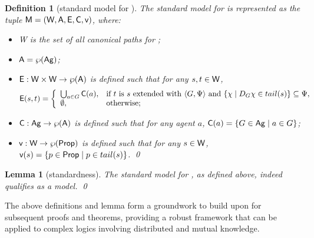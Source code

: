 \documentclass{article}
\newtheorem{definition}[theorem]{Definition}%
\newtheorem{lemma}[theorem]{Lemma}%
\newcommand{\ag}{\text{\normalfont\textsf{Ag}}\xspace}
\newcommand{\CA}{\textnormal{\sf A}\xspace}
\newcommand{\CC}{\textnormal{\sf C}\xspace}
\newcommand{\CE}{\textnormal{\sf E}\xspace}
\newcommand{\CM}{\textnormal{\sf M}\xspace}
\newcommand{\CV}{\textnormal{\sf v}\xspace}
\newcommand{\CW}{\textnormal{\sf W}\xspace}
\newcommand{\prop}{\text{\normalfont\textsf{Prop}}\xspace}
\newcommand{\ld}{\text{\normalfont ELD}\xspace}
\begin{document}
\begin{definition}[standard model for \ld]
The standard model for \ld is represented as the tuple $\CM = (\CW, \CA, \CE, \CC, \CV)$, where:
\begin{itemize}
\item \CW is the set of all canonical paths for \ld;
\item $\CA = \wp(\ag)$;
\item $\CE : \CW \times \CW \to \wp(\CA)$ is defined such that for any $s, t \in \CW$, 
$$\CE(s,t)  = \left\{\begin{array}{ll}
	\bigcup_{a\in G} \CC(a), & \text{if $t$ is $s$ extended with $\langle G,\Psi \rangle$ and $\{\chi\mid D_G\chi \in tail(s)\} \subseteq \Psi$},\\
	\emptyset, & \text{otherwise;}
\end{array}\right.$$
%
\item $\CC : \ag \to \wp(\CA)$ is defined such that for any agent $a$, $\CC(a)=\{G \in \ag \mid a \in G \}$;
\item $\CV: \CW \to \wp(\prop)$ is defined such that for any $s \in \CW$, $\CV (s) = \{p \in \prop \mid p \in tail(s)\}$.
\qed
\end{itemize}
\end{definition}

\begin{lemma}[standardness]
The standard model for \ld, as defined above, indeed qualifies as a model.
\qed
\end{lemma}

The above definitions and lemma form a groundwork to build upon for subsequent proofs and theorems, providing a robust framework that can be applied to complex logics involving distributed and mutual knowledge.
\end{document}
